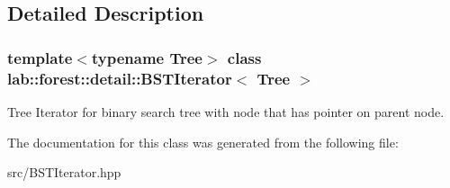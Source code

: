 \subsection{Detailed Description}
\subsubsection*{template$<$typename Tree$>$\newline
class lab\+::forest\+::detail\+::\+B\+S\+T\+Iterator$<$ Tree $>$}

Tree Iterator for binary search tree with node that has pointer on parent node. 

The documentation for this class was generated from the following file\+:\begin{DoxyCompactItemize}
\item 
src/B\+S\+T\+Iterator.\+hpp\end{DoxyCompactItemize}
